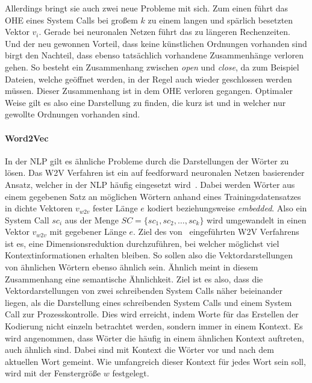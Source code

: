                 Allerdings bringt sie auch zwei neue Probleme mit sich.
                Zum einen führt das \ac{OHE} eines System Calls bei großem $k$ zu einem langen und spärlich besetzten Vektor $v_i$.
                Gerade bei neuronalen Netzen führt das zu längeren Rechenzeiten.
                Und der neu gewonnen Vorteil, dass keine künstlichen Ordnungen vorhanden sind birgt den Nachteil, dass ebenso tatsächlich vorhandene Zusammenhänge verloren gehen.
                So besteht ein Zusammenhang zwischen \textit{open} und \textit{close}, da zum Beispiel Dateien, welche geöffnet werden, in der Regel auch wieder geschlossen werden müssen.
                Dieser Zusammenhang ist in dem \ac{OHE} verloren gegangen. 
                Optimaler Weise gilt es also eine Darstellung zu finden, die kurz ist und in welcher nur gewollte Ordnungen vorhanden sind.
            \paragraph{Word2Vec}
                In der \ac{NLP} gilt es ähnliche Probleme durch die Darstellungen der Wörter zu lösen.
                Das \ac{W2V} Verfahren ist ein auf feedforward neuronalen Netzen basierender Ansatz, welcher in der \ac{NLP} häufig eingesetzt wird~\cite{W2VAYYADEVARA2018}.
                Dabei werden Wörter aus einem gegebenen Satz an möglichen Wörtern anhand eines Trainingsdatensatzes in dichte Vektoren $v_{w2v}$ fester Länge $e$ kodiert beziehungsweise \textit{embedded}.
                Also ein System Call $sc_i$ aus der Menge $SC = \{sc_1,sc_2,\dots,sc_k\}$ wird umgewandelt in einen Vektor $v_{w2v}$ mit gegebener Länge $e$.
                Ziel des von~\cite{W2VMIKOLOV2013} eingeführten \ac{W2V} Verfahrens ist es, eine Dimensionsreduktion durchzuführen, bei welcher möglichst viel Kontextinformationen erhalten bleiben.
                So sollen also die Vektordarstellungen von ähnlichen Wörtern ebenso ähnlich sein.
                Ähnlich meint in diesem Zusammenhang eine semantische Ähnlichkeit.
                Ziel ist es also, dass die Vektordarstellungen von zwei schreibenden System Calls näher beieinander liegen, als die Darstellung eines schreibenden System Calls und einem System Call zur Prozesskontrolle. 
                Dies wird erreicht, indem Worte für das Erstellen der Kodierung nicht einzeln betrachtet werden, sondern immer in einem Kontext.
                Es wird angenommen, dass Wörter die häufig in einem ähnlichen Kontext auftreten, auch ähnlich sind.
                Dabei sind mit Kontext die Wörter vor und nach dem aktuellen Wort gemeint.
                Wie umfangreich dieser Kontext für jedes Wort sein soll, wird mit der Fenstergröße $w$ festgelegt.\par\medskip

